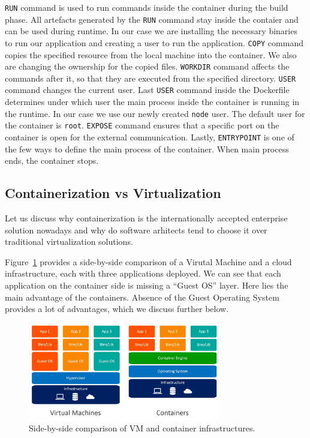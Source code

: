 \lstinline{RUN} command is used to run commands inside the container during the build phase. All artefacts generated by the \lstinline{RUN} command stay inside the contaier and can be used during runtime. In our case we are installing the necessary binaries to run our application and creating a user to run the application. \lstinline{COPY} command copies the specified resource from the local machine into the container. We also are changing the ownership for the copied files. \lstinline{WORKDIR} command affects the commands after it, so that they are executed from the specified directory. \lstinline{USER} command changes the current user. Last \lstinline{USER} command inside the Dockerfile determines under which user the main process inside the container is running in the runtime. In our case we use our newly created \lstinline{node} user. The default user for the container is \lstinline{root}. \lstinline{EXPOSE} command ensures that a specific port on the container is open for the external communication. Lastly, \lstinline{ENTRYPOINT} is one of the few ways to define the main process of the container. When main process ends, the container stops.

\subsection{Containerization vs Virtualization}

Let us discuss why containerization is the internationally accepted enterprise solution nowadays and why do software arhitects tend to choose it over traditional virtualization solutions.

Figure~\ref{img:containers-vs-virtual-machines} provides a side-by-side comparison of a Virutal Machine and a cloud infrastructure, each with three applications deployed. We can see that each application on the container side is missing a ``Guest OS'' layer. Here lies the main advantage of the containers. Absence of the Guest Operating System provides a lot of advantages, which we discuss further below.

\begin{figure}[!hbt]
	\begin{center}
		\includegraphics[width=0.75\textwidth]{images/containers-vs-virtual-machines.jpg}
        \caption{Side-by-side comparison of VM and container infrastructures.}
		\label{img:containers-vs-virtual-machines}
	\end{center}
\end{figure}

